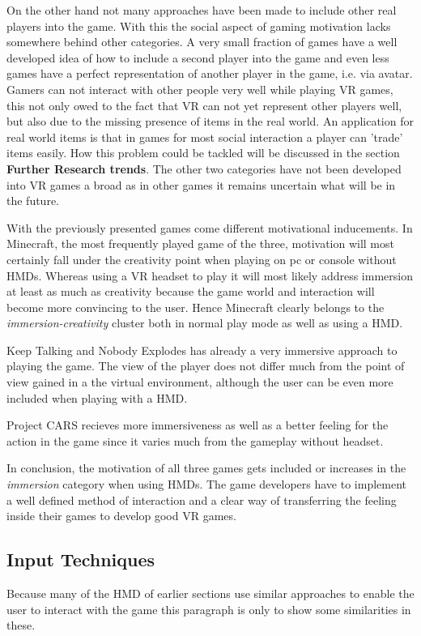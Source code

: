 On the other hand not many approaches have been made to include other real players into the game. With this the social aspect of gaming motivation lacks somewhere behind other categories. A very small fraction of games have a well developed idea of how to include a second player into the game and even less games have a perfect representation of another player in the game, i.e. via avatar. \newline
Gamers can not interact with other people very well while playing VR games, this not only owed to the fact that VR can not yet represent other players well, but also due to the missing presence of items in the real world. An application for real world items is that in games for most social interaction a player can 'trade' items easily. How this problem could be tackled will be discussed in the section \textbf{Further Research trends}. \newline 
The other two categories have not been developed into VR games a broad as in other games it remains uncertain what will be in the future.

With the previously presented games come different motivational inducements. \newline
In Minecraft, the most frequently played game of the three, motivation will most certainly fall under the creativity point when playing on pc or console without HMDs. Whereas using a VR headset to play it will most likely address immersion at least as much as creativity because the game world and interaction will become more convincing to the user. Hence Minecraft clearly belongs to the \textit{immersion-creativity} cluster both in normal play mode as well as using a HMD.

Keep Talking and Nobody Explodes has already a very immersive approach to playing the game. The view of the player does not differ much from the point of view gained in a the virtual environment, although the user can be even more included when playing with a HMD.

Project CARS recieves more immersiveness as well as a better feeling for the action in the game since it varies much from the gameplay without headset. 

In conclusion, the motivation of all three games gets included or increases in the \textit{immersion} category when using HMDs. The game developers have to implement a well defined method of interaction and a clear way of transferring the feeling inside their games to develop good VR games. 

\subsection{Input Techniques}
Because many of the HMD of earlier sections use similar approaches to enable 
the user to interact with the game this paragraph is only to show some 
similarities in these. 

